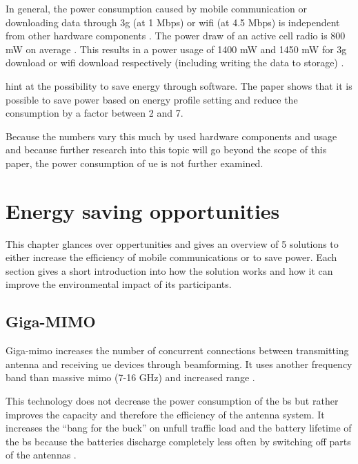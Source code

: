 \documentclass[11pt,a4paper]{article}
\begin{document}
In general, the power consumption caused by mobile communication or downloading data through \acrshort{3g} (at 1 Mbps) or \acrshort{wifi} (at 4.5 Mbps) is independent from other hardware components \citep{smartphoneEnergySurvey}.
The power draw of an active cell radio is 800 mW on average \citep{smartphoneEnergyConsumption}.
This results in a power usage of 1400 mW and 1450 mW for \acrshort{3g} download or \acrshort{wifi} download respectively (including writing the data to storage) \citep{smartphoneEnergySurvey}.

\cite{profilingMobilePower} hint at the possibility to save energy through software.
The paper shows that it is possible to save power based on energy profile setting and reduce the consumption by a factor between 2 and 7.

Because the numbers vary this much by used hardware components and usage and because further research into this topic will go beyond the scope of this paper, the power consumption of \acrlong{ue} is not further examined.

\section{Energy saving opportunities}\label{sec:opportunities}
This chapter glances over oppertunities and gives an overview of 5 solutions to either increase the efficiency of mobile communications or to save power.
Each section gives a short introduction into how the solution works and how it can improve the environmental impact of its participants.

\subsection{Giga-MIMO}\label{subsec:gigamimo}
Giga-\acrshort{mimo} increases the number of concurrent connections between transmitting antenna and receiving \acrlong{ue} devices through beamforming.
It uses another frequency band than massive \acrshort{mimo} (7-16 GHz) and increased range \citep{3gpp17}.

This technology does not decrease the power consumption of the \acrlong{bs} but rather improves the capacity and therefore the efficiency of the antenna system.
It increases the \enquote{bang for the buck} on unfull traffic load and the battery lifetime of the \acrshort{bs} because the batteries discharge completely less often by switching off parts of the antennas \citep{qualcomm2022}.
\end{document}
